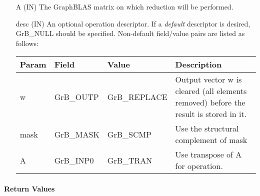 \begin{itemize}[leftmargin=1.1in]
    \item[{\sf A}]     ({\sf IN}) The GraphBLAS matrix on which
	    reduction will be performed.

    \item[{\sf desc}] ({\sf IN}) An optional operation descriptor. If
    a \emph{default} descriptor is desired, {\sf GrB\_NULL} should be
    specified. Non-default field/value pairs are listed as follows:  \\

    \begin{tabular}{lllp{2.5in}}
        Param & Field  & Value & Description \\
        \hline
        {\sf w}    & {\sf GrB\_OUTP} & {\sf GrB\_REPLACE} & Output vector {\sf w}
        is cleared (all elements removed) before the result is stored in it. \\
        
	    {\sf mask} & {\sf GrB\_MASK} & {\sf GrB\_SCMP}   & Use the structural complement of {\sf mask}\\
        {\sf A}    & {\sf GrB\_INP0} & {\sf GrB\_TRAN}   & Use transpose of {\sf A} for operation. 
    \end{tabular}
\end{itemize}

\paragraph{Return Values}

